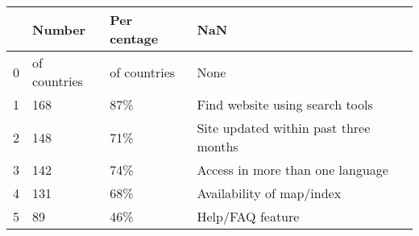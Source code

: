 \begin{tabular}{llll}
\toprule
{} &        Number &   Per centage &                                    NaN \\
\midrule
0 &  of countries &  of countries &                                   None \\
1 &           168 &           87\% &        Find website using search tools \\
2 &           148 &           71\% &  Site updated within past three months \\
3 &           142 &           74\% &       Access in more than one language \\
4 &           131 &           68\% &              Availability of map/index \\
5 &            89 &           46\% &                       Help/FAQ feature \\
\bottomrule
\end{tabular}
